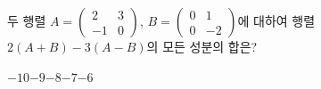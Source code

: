 \hspace*{2mm}\begin{minipage}[t]{\dimexpr\linewidth-2mm\relax}\vspace{0pt}
두 행렬 $A=\begin{pmatrix} 2 & 3 \\ -1 & 0 \end{pmatrix}$, $B=\begin{pmatrix} 0 & 1 \\ 0 & -2 \end{pmatrix}$에 대하여 행렬 $2(A+B)-3(A-B)$의 모든 성분의 합은?
\begin{choices32}{$-10$}{$-9$}{$-8$}{$-7$}{$-6$}\end{choices32}\end{minipage}
